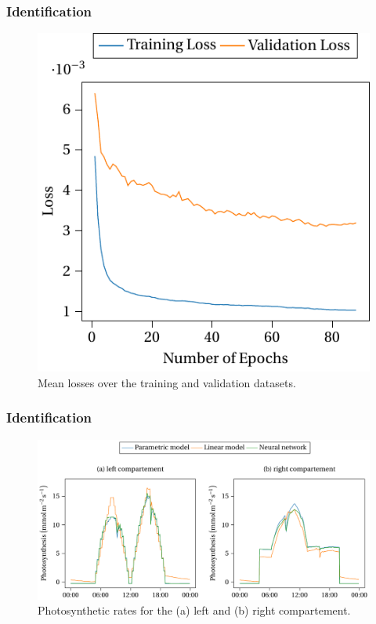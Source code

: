 \begin{frame}
    \frametitle{Identification}
    \begin{figure}
        \centering
        \includegraphics[scale=0.5]{figures/nn2.pdf}
        \caption{Mean losses over the training and validation datasets.}
    \end{figure}
\end{frame}

\begin{frame}
    \frametitle{Identification}
    \begin{figure}
        \centering
        \includegraphics[scale=0.5]{figures/nn3.pdf}
        \caption{Photosynthetic rates for the (a) left and (b) right compartement.}
    \end{figure}
\end{frame}